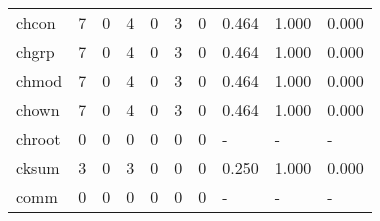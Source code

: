 \begin{longtable}{lp{1.3cm}p{1.3cm}p{1.3cm}p{1.3cm}p{1.3cm}p{1.3cm}p{1.3cm}p{1.3cm}p{1.3cm}}
chcon     &                      7 &                                  0 &                                 4 &                                0 &                                 3 &                               0 &                                0.464 &                                  1.000 &                                0.000 \\
chgrp     &                      7 &                                  0 &                                 4 &                                0 &                                 3 &                               0 &                                0.464 &                                  1.000 &                                0.000 \\
chmod     &                      7 &                                  0 &                                 4 &                                0 &                                 3 &                               0 &                                0.464 &                                  1.000 &                                0.000 \\
chown     &                      7 &                                  0 &                                 4 &                                0 &                                 3 &                               0 &                                0.464 &                                  1.000 &                                0.000 \\
chroot    &                      0 &                                  0 &                                 0 &                                0 &                                 0 &                               0 &                                    - &                                      - &                                    - \\
cksum     &                      3 &                                  0 &                                 3 &                                0 &                                 0 &                               0 &                                0.250 &                                  1.000 &                                0.000 \\
comm      &                      0 &                                  0 &                                 0 &                                0 &                                 0 &                               0 &                                    - &                                      - &                                    - \\

\end{longtable}
